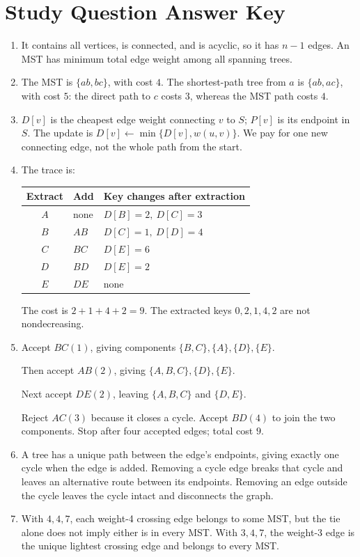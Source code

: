 \documentclass[11pt,letterpaper]{article}
\begin{document}
\section{Study Question Answer Key}
\begin{enumerate}
 \item It contains all vertices, is connected, and is acyclic, so it has $n-1$ edges. An MST has minimum total edge weight among all spanning trees.
 \item The MST is $\{ab,bc\}$, with cost $4$. The shortest-path tree from $a$ is $\{ab,ac\}$, with cost $5$: the direct path to $c$ costs $3$, whereas the MST path costs $4$.
 \item $D[v]$ is the cheapest edge weight connecting $v$ to $S$; $P[v]$ is its endpoint in $S$. The update is $D[v]\gets\min\{D[v],w(u,v)\}$. We pay for one new connecting edge, not the whole path from the start.
 \item The trace is:
 \begin{center}\small
 \begin{tabular}{cll}
 \toprule
 Extract & Add & Key changes after extraction \\
 \midrule
 $A$ & none & $D[B]=2,\ D[C]=3$ \\
 $B$ & $AB$ & $D[C]=1,\ D[D]=4$ \\
 $C$ & $BC$ & $D[E]=6$ \\
 $D$ & $BD$ & $D[E]=2$ \\
 $E$ & $DE$ & none \\
 \bottomrule
 \end{tabular}
 \end{center}
 The cost is $2+1+4+2=\boxed{9}$. The extracted keys $0,2,1,4,2$ are not nondecreasing.
 \item Accept $BC(1)$, giving components $\{B,C\},\{A\},\{D\},\{E\}$.\par
 Then accept $AB(2)$, giving $\{A,B,C\},\{D\},\{E\}$.\par
 Next accept $DE(2)$, leaving $\{A,B,C\}$ and $\{D,E\}$.\par
 Reject $AC(3)$ because it closes a cycle. Accept $BD(4)$ to join the two components. Stop after four accepted edges; total cost $9$.
 \item A tree has a unique path between the edge's endpoints, giving exactly one cycle when the edge is added. Removing a cycle edge breaks that cycle and leaves an alternative route between its endpoints. Removing an edge outside the cycle leaves the cycle intact and disconnects the graph.
 \item With $4,4,7$, each weight-4 crossing edge belongs to some MST, but the tie alone does not imply either is in every MST. With $3,4,7$, the weight-3 edge is the unique lightest crossing edge and belongs to every MST.

\end{enumerate}
\end{document}

